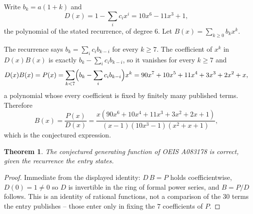 \documentclass[11pt,a4paper]{article}
\theoremstyle{plain}
\newtheorem{theorem}{Theorem}
\theoremstyle{definition}
\begin{document}
Write $b_k=a(1+k)$ and
\[
  D(x)=1-\sum_{i} c_i x^{i}=10 x^{6} - 11 x^{3} + 1 ,
\]
the polynomial of the stated recurrence, of degree $6$. Let $B(x)=\sum_{k\ge0}b_kx^k$.

The recurrence says $b_k=\sum_i c_ib_{k-i}$ for every $k\ge 7$. The coefficient of $x^k$ in
$D(x)B(x)$ is exactly $b_k-\sum_i c_ib_{k-i}$, so it vanishes for every $k\ge 7$ and
\[
  D(x)B(x)=P(x)=\sum_{k<7}\Bigl(b_k-\sum_i c_ib_{k-i}\Bigr)x^k
         =90 x^{7} + 10 x^{5} + 11 x^{4} + 3 x^{3} + 2 x^{2} + x ,
\]
a polynomial whose every coefficient is fixed by finitely many published terms. Therefore
\[
  B(x)=\frac{P(x)}{D(x)}=\frac{x \left(90 x^{6} + 10 x^{4} + 11 x^{3} + 3 x^{2} + 2 x + 1\right)}{\left(x - 1\right) \left(10 x^{3} - 1\right) \left(x^{2} + x + 1\right)} ,
\]
which is the conjectured expression.

\begin{theorem}
The conjectured generating function of OEIS A083178 is correct, given the recurrence the entry
states.
\end{theorem}

\begin{proof}
Immediate from the displayed identity: $D\,B=P$ holds coefficientwise, $D(0)=1\ne0$ so $D$ is
invertible in the ring of formal power series, and $B=P/D$ follows. This is an identity of
rational functions, not a comparison of the $30$ terms the entry publishes -- those
enter only in fixing the $7$ coefficients of $P$.
\end{proof}
\end{document}
